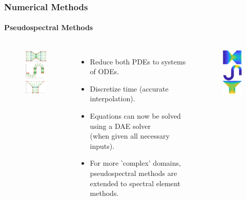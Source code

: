 \documentclass[aspectratio=169,xcolor=dvipsnames]{beamer}
\begin{document}
\begin{frame}
	\frametitle{Numerical Methods}
	\framesubtitle{Pseudospectral Methods}
		\begin{columns}
			\begin{figure}
				\includegraphics[width=3.4cm]{CurrentDisc.png}
			\end{figure}

    \begin{itemize}
    	\item Reduce both PDEs to systems of ODEs.
    	\item Discretize time (accurate interpolation).
    	\item Equations can now be solved using a DAE solver \\
    	(when given all necessary inputs).
    	\item For more 'complex' domains, pseudospectral methods are extended to spectral element methods.
    \end{itemize}


	\vspace{-0.5cm}
	\begin{figure}
		\includegraphics[width=3cm]{Current.png}
	\end{figure}
\end{columns}

\end{frame}
\end{document}
